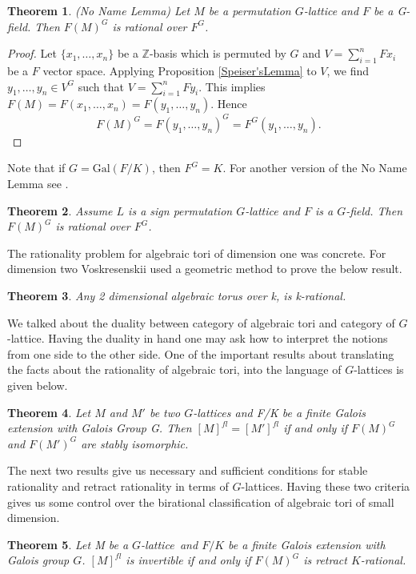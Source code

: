 \documentclass{article}
\theoremstyle{plain}
\newtheorem{theorem}{Theorem}
\theoremstyle{definition}
\newcommand{\Z}{\ensuremath{\mathbb{Z}}}
\newcommand{\G}{G}
\newcommand{\glat}{$G$-lattice}
\begin{document}
\label{action}
\begin{theorem}\cite{Speiser}\label{NoNameLemma}
(No Name Lemma) Let $M$ be a permutation \glat \,\,and $F$ be a \G-field. Then $F(M)^\G$ is rational over $F^\G$. 
\end{theorem}
\begin{proof}
Let $\lbrace x_1, \ldots , x_n \rbrace$ be a $\Z$-basis which is permuted by $G$ and $V = \sum^n_{i=1}Fx_i$ be a $F$ vector space. Applying Proposition \ref{Speiser'sLemma} to $V$, we find $y_1, \ldots , y_n \in V^G $ such that $V = \sum^n_{i=1}Fy_i$. This implies $F(M) = F(x_1, \ldots, x_n) = F(y_1, \ldots, y_n)$. Hence $$F(M)^G = F(y_1, \ldots , y_n)^G = F^G(y_1, \dots, y_n).$$ 
\end{proof}
\noindent
Note that if $\G = \mathrm{Gal} (F/K)$, then $F^\G = K$. For another version of the No Name Lemma see \cite{Domokos}.
\begin{theorem}\cite[Proposition 9.5.1]{Lorenz}\label{SignPermRational}
Assume $L$ is a sign permutation $G$-lattice and $F$ is a $G$-field. Then $F(M)^G$ is rational over $F^G$.
\end{theorem}
\noindent
The rationality problem for algebraic tori of dimension one was concrete. For dimension two Voskresenskii used a geometric method to prove the below result. 
\begin{theorem}
\cite{Vos67} Any 2 dimensional algebraic torus over k, is k-rational.
\end{theorem} 
\noindent
We talked about the duality between category of algebraic tori and category of \glat . Having the duality in hand one may ask how to interpret the notions from one side to the other side. One of the important results about translating the facts about the rationality of algebraic tori, into the language of \glat s is given below.
\begin{theorem}\cite{Vos74}
Let $M$ and $M'$ be two \glat s  and F/K be a finite Galois extension with Galois Group \G . Then $[M]^{fl}=[M']^{fl}$ if and only if $ F(M)^\G $ and $ F(M')^\G$ are stably isomorphic.
\end{theorem}
\noindent
The next two results give us necessary and sufficient conditions for stable rationality and retract rationality in terms of \glat  s. Having these two criteria gives us some control over the
birational classification of algebraic tori of small dimension.
\begin{theorem}\cite[Theorem 9.5.4]{Lorenz} Let M be a \glat \,
and $F/K$ be a finite Galois extension with Galois group $G$. $[M]^{fl}$ is invertible if and only if $F(M)^\G$ is retract $K$-rational.
\end{theorem}
\end{document}
